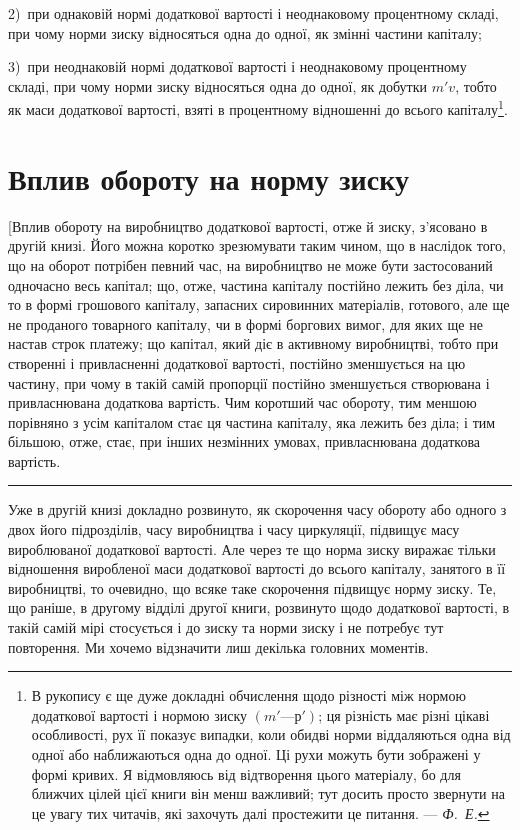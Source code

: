 \parcont{}  %
2)~при однаковій нормі додаткової вартості і неоднаковому
процентному складі, при чому норми зиску відносяться одна до
одної, як змінні частини капіталу;

3)~при неоднаковій нормі додаткової вартості і неоднаковому
процентному складі, при чому норми зиску відносяться одна до
одної, як добутки $m'v$, тобто як маси додаткової вартості,
взяті в процентному відношенні до всього капіталу\footnote{
В рукопису є ще дуже докладні обчислення щодо різності між нормою
додаткової вартості і нормою зиску $(m' — р')$; ця різність має різні цікаві особливості,
рух її показує випадки, коли обидві норми віддаляються одна від
одної або наближаються одна до одної. Ці рухи можуть бути зображені у формі
кривих. Я відмовляюсь від відтворення цього матеріалу, бо для ближчих цілей
цієї книги він менш важливий; тут досить просто звернути на це увагу тих
читачів, які захочуть далі простежити це питання. — \emph{Ф.~Е.}
}.

\section{Вплив обороту на норму зиску}

[Вплив обороту на виробництво додаткової вартості, отже
й зиску, з’ясовано в другій книзі. Його можна коротко зрезюмувати
таким чином, що в наслідок того, що на оборот потрібен
певний час, на виробництво не може бути застосований одночасно
весь капітал; що, отже, частина капіталу постійно лежить без
діла, чи то в формі грошового капіталу, запасних сировинних
матеріалів, готового, але ще не проданого товарного капіталу,
чи в формі боргових вимог, для яких ще не настав строк платежу;
що капітал, який діє в активному виробництві, тобто при
створенні і привласненні додаткової вартості, постійно зменшується
на цю частину, при чому в такій самій пропорції постійно
зменшується створювана і привласнювана додаткова вартість.
Чим коротший час обороту, тим меншою порівняно з усім
капіталом стає ця частина капіталу, яка лежить без діла; і тим
більшою, отже, стає, при інших незмінних умовах, привласнювана
додаткова вартість.

\pfbreak

Уже в другій книзі докладно розвинуто, як скорочення часу
обороту або одного з двох його підрозділів, часу виробництва
і часу циркуляції, підвищує масу вироблюваної додаткової вартості.
Але через те що норма зиску виражає тільки відношення
виробленої маси додаткової вартості до всього капіталу, занятого
в її виробництві, то очевидно, що всяке таке скорочення підвищує
норму зиску. Те, що раніше, в другому відділі другої
книги, розвинуто щодо додаткової вартості, в такій самій мірі
стосується і до зиску та норми зиску і не потребує тут повторення.
Ми хочемо відзначити лиш декілька головних моментів.


